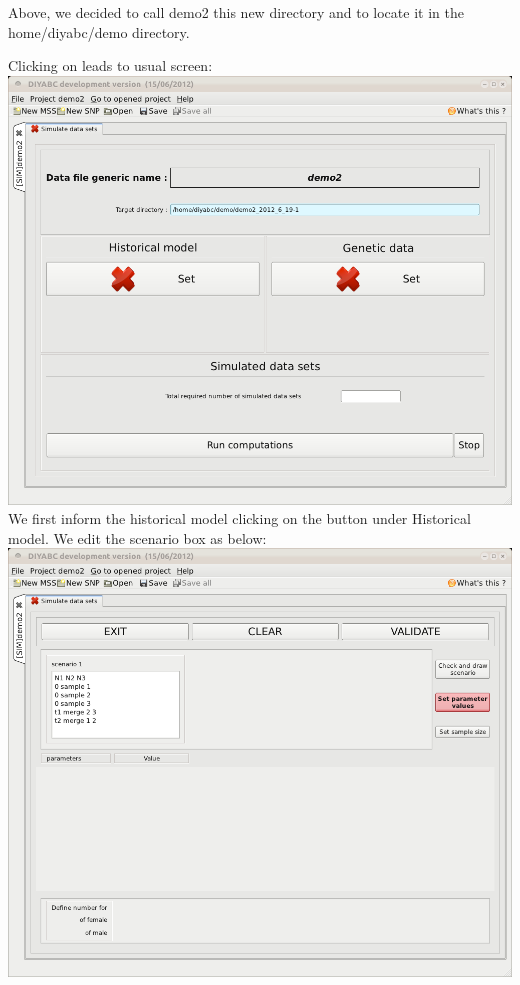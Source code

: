 Above, we decided to call \textsf{demo2} this new directory and to locate it in the \textsf{home/diyabc/demo} directory.

Clicking on  leads to usual screen:\\

\includegraphics[scale=0.33]{gui_pictures/Capture-DIYABC-65.png} \\

We first inform the historical model clicking on the   button under \textsf{Historical model}. We edit the scenario box as below:\\

\includegraphics[scale=0.33]{gui_pictures/Capture-DIYABC-66.png} \\

